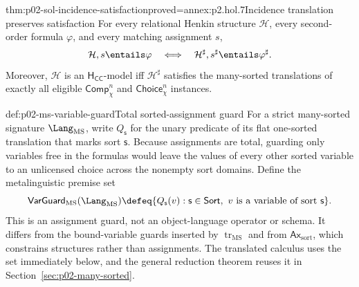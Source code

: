 \begin{hbtheorem}{thm:p02-sol-incidence-satisfaction}{proved=annex:p2.hol.7}{Incidence translation preserves satisfaction}
For every relational Henkin structure \(\mathcal H\), every second-order
formula \(\varphi\), and every matching assignment \(s\),
\[
 \mathcal H,s\entails\varphi
 \quad\Longleftrightarrow\quad
 \mathcal H^\sharp,s^\sharp\entails\varphi^\sharp.
\]
Moreover, \(\mathcal H\) is an \(\mathsf H_{\mathsf{CC}}\)-model iff
\(\mathcal H^\sharp\) satisfies the many-sorted translations of exactly all
eligible \(\mathsf{Comp}_{\chi}^{n}\) and
\(\mathsf{Choice}_{\chi}^{n}\) instances.
\end{hbtheorem}

\begin{hbdefinition}{def:p02-ms-variable-guard}{Total sorted-assignment guard}
For a strict many-sorted signature \(\Lang_{\mathrm{MS}}\), write
\(Q_{\mathsf s}\) for the unary predicate of its flat one-sorted translation
that marks sort \(\mathsf s\).  Because assignments are total, guarding only
variables free in the formulas would leave the values of every other sorted
variable to an unlicensed choice across the nonempty sort domains.  Define
the metalinguistic premise set
\[
 \mathsf{VarGuard}_{\mathrm{MS}}(\Lang_{\mathrm{MS}})
 \defeq\{Q_{\mathsf s}(v):\mathsf s\in\mathsf{Sort},
       \ v\text{ is a variable of sort }\mathsf s\}.
\]
This is an assignment guard, not an object-language operator or schema.  It
differs from the bound-variable guards inserted by
\(\operatorname{tr}_{\mathrm{MS}}\) and from
\(\mathsf{Ax}_{\mathrm{sort}}\), which constrains structures rather than
assignments.  The translated calculus uses the set immediately below, and
the general reduction theorem reuses it in
Section~\ref{sec:p02-many-sorted}.
\end{hbdefinition}

